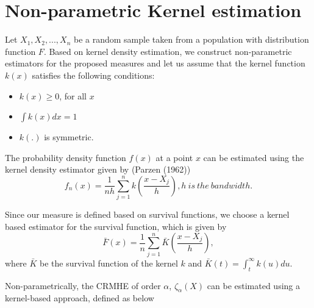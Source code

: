 \documentclass[11pt,reqno]{amsart}
\theoremstyle{tight}
\begin{document}

\section{Non-parametric Kernel estimation}
Let $X_1,X_2,...,X_n$ be a random sample taken from a population with distribution function
$F$. Based on kernel density estimation, we construct non-parametric estimators for the proposed measures and let us assume that the kernel function $k(x)$ satisfies the following conditions:
\begin{itemize}
    \item[1.] $k(x) \geq 0$, for all $x$
    \item[2.] $\int {k(x)} dx =1$
    \item[3.] $k(.)$ is symmetric.
\end{itemize}
 The probability density function $f(x)$ at a point $x$ can be estimated using the kernel density estimator given by (Parzen (1962))
\begin{equation}\label{f x}
    f_n(x)=\frac{1}{nh}\sum_{j=1}^{n}k\left(\frac{x-X_j}{h}\right),  h ~is ~the ~ bandwidth.
\end{equation}


Since our measure is defined based on survival functions, we choose a kernel based estimator for the survival function, which is given by
\begin{equation}\label{F x}
    \bar{F}(x)=\frac{1}{n}\sum_{j=1}^{n}\bar{K}\left(\frac{x-X_j}{h}\right),
\end{equation}
where $\bar{K}$ be the survival function of the kernel $k$ and $\bar{K}(t)=\int_{t}^{\infty}k(u)du$. \par

\sloppy
Non-parametrically, the CRMHE of order $\alpha$, $\zeta_{\alpha}(X)$ can be estimated using a kernel-based approach, defined as below
\end{document}
